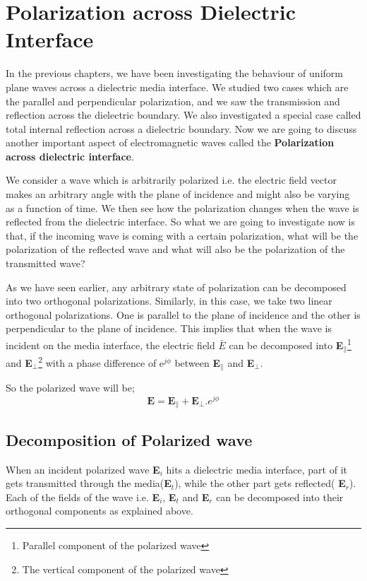 \chapter{Polarization across Dielectric Interface}\label{lec:lec33}
In the previous chapters, we have been investigating the behaviour of uniform plane waves across a dielectric media interface. We studied two cases which are the parallel and perpendicular polarization, and we saw the transmission and reflection across the dielectric boundary. We also investigated a special case called total internal reflection across a dielectric boundary. Now we are going to discuss another important aspect of electromagnetic waves called the \textbf{Polarization across dielectric interface}. 

We consider a wave which is arbitrarily polarized i.e. the electric field vector makes an arbitrary angle with the plane of incidence and might also be varying as a function of time. We then see how the polarization changes when the wave is reflected from the dielectric interface. So what we are going to investigate now is that, if the incoming wave is coming with a certain polarization, what will be the polarization of the reflected wave and what will also be the polarization of the transmitted wave?

As we have seen earlier, any arbitrary state of polarization can be decomposed into two orthogonal polarizations. Similarly, in this case, we take two linear orthogonal polarizations. One is parallel to the plane of incidence and the other is perpendicular to the plane of incidence. This implies that when the wave is incident on the media interface, the electric field \textbf{$\bar{E}$} can be decomposed into \textbf{E}$_\parallel$\footnote{
Parallel component of the polarized wave
} and \textbf{E}$_\perp$\footnote{
The vertical component of the polarized wave
} with a phase difference of e$^{j\phi}$ between \textbf{E}$_\parallel$ and \textbf{E}$_\perp$.

So the polarized wave will be; $$\textbf{E} = \textbf{E}_\parallel + \textbf{E}_\perp.e^{j\phi}$$	

\section{Decomposition of Polarized wave}	
When an incident polarized wave \textbf{E$_i$} hits a dielectric media interface, part of it gets transmitted through the media(\textbf{E$_t$}), while the other part gets reflected( \textbf{E$_r$}). Each of the fields of the wave i.e. \textbf{E$_i$}, \textbf{E$_t$} and \textbf{E$_r$} can be decomposed into their orthogonal components as explained above.	
